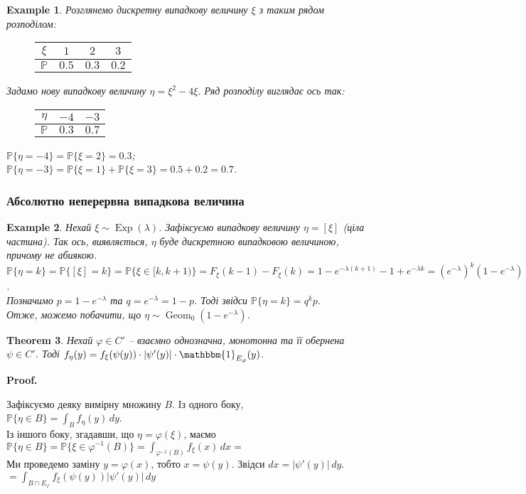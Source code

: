\documentclass[a4paper, 10pt]{article}
\makeatletter
\theoremstyle{theoremdd}
\newtheorem{theorem}{Theorem}[subsection]
\newtheorem{example}[theorem]{Example}
\renewenvironment{proof}[1][Proof.\\]{\par
\pushQED{\hfill \qed}%
\normalfont \topsep6\p@\@plus6\p@\relax
\trivlist
\item\relax
{\bfseries
#1\@addpunct{.}}\hspace\labelsep\ignorespaces
}{%
\popQED\endtrivlist\@endpefalse
}
\DeclareMathOperator{\Geom}{Geom}
\DeclareMathOperator{\Exp}{Exp}
\makeatother
\begin{document}
\begin{example}
Розглянемо дискретну випадкову величину $\xi$ з таким рядом розподілом:
\begin{figure}[H]
\centering
\begin{tabular}{c|c|c|c}
$\xi$ & $1$ & $2$ & $3$ \\
\hline
$\mathbb{P}$ & $0.5$ & $0.3$ & $0.2$
\end{tabular}
\end{figure}
\noindent
Задамо нову випадкову величину $\eta = \xi^2 - 4\xi$. Ряд розподілу виглядає ось так:
\begin{figure}[H]
\centering
\begin{tabular}{c|c|c}
$\eta$ & $-4$ & $-3$ \\
\hline
$\mathbb{P}$ & $0.3$ & $0.7$
\end{tabular}
\end{figure}
\noindent
$\mathbb{P}\{\eta = -4\} = \mathbb{P}\{\xi = 2\} = 0.3$;\\
$\mathbb{P}\{\eta = -3\} = \mathbb{P}\{\xi = 1\} + \mathbb{P}\{\xi = 3\} = 0.5 + 0.2 = 0.7$.
\end{example}

\subsubsection{Абсолютно неперервна випадкова величина}
\begin{example}
Нехай $\xi \sim \Exp(\lambda)$. Зафіксуємо випадкову величину $\eta = [\xi]$ (ціла частина). Так ось, виявляється, $\eta$ буде дискретною випадковою величиною, причому не абиякою.\\
$\mathbb{P}\{\eta = k\} = \mathbb{P}\{[\xi] = k\} = \mathbb{P}\{\xi \in [k,k+1)\} = F_\xi(k-1) - F_\xi(k) = 1 - e^{-\lambda (k+1)} - 1 + e^{-\lambda k} = (e^{-\lambda})^k (1-e^{-\lambda})$.\\
Позначимо $p = 1-e^{-\lambda}$ та $q = e^{-\lambda} = 1-p$. Тоді звідси $\mathbb{P}\{\eta = k\} = q^k p$.\\
Отже, можемо побачити, що $\eta \sim \Geom_0(1-e^{-\lambda})$.
\end{example}

\begin{theorem}
Нехай $\varphi \in C'$ -- взаємно однозначна, монотонна та її обернена $\psi \in C'$. Тоді $f_\eta(y) = f_\xi(\psi(y)) \cdot |\psi'(y)| \cdot \mathbbm{1}_{E_\varphi}(y)$.
\end{theorem}

\begin{proof}
Зафіксуємо деяку вимірну множину $B$. Із одного боку,\\
$\mathbb{P}\{\eta \in B\} = \displaystyle\int_B f_\eta(y)\,dy$.\\
Із іншого боку, згадавши, що $\eta = \varphi(\xi)$, маємо\\
$\mathbb{P}\{\eta \in B\} = \mathbb{P}\{\xi \in \varphi^{-1}(B)\} = \displaystyle\int_{\varphi^{-1}(B)} f_\xi(x)\,dx \boxed{=}$\\
Ми проведемо заміну $y = \varphi(x)$, тобто $x = \psi(y)$. Звідси $dx = |\psi'(y)|\,dy$.\\
$\boxed{=} \displaystyle\int_{B \cap E_\varphi} f_\xi(\psi(y)) |\psi'(y)|\,dy$
\end{proof}
\end{document}
